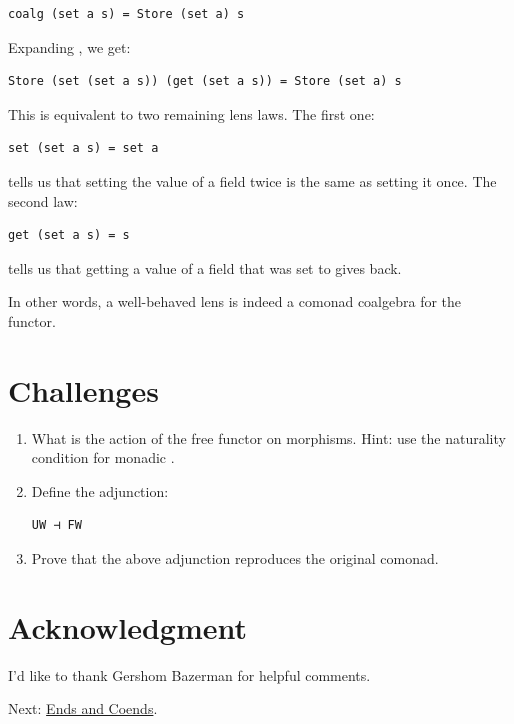 \begin{verbatim}
coalg (set a s) = Store (set a) s
\end{verbatim}

Expanding , we get:

\begin{verbatim}
Store (set (set a s)) (get (set a s)) = Store (set a) s
\end{verbatim}

This is equivalent to two remaining lens laws. The first one:

\begin{verbatim}
set (set a s) = set a
\end{verbatim}

tells us that setting the value of a field twice is the same as setting
it once. The second law:

\begin{verbatim}
get (set a s) = s
\end{verbatim}

tells us that getting a value of a field that was set to 
gives  back.

In other words, a well-behaved lens is indeed a comonad coalgebra for
the  functor.

\section{Challenges}\label{challenges}

\begin{enumerate}
\item
  What is the action of the free functor
   on morphisms. Hint: use the
  naturality condition for monadic .
\item
  Define the adjunction:

\begin{verbatim}
UW ⊣ FW
\end{verbatim}
\item
  Prove that the above adjunction reproduces the original comonad.
\end{enumerate}

\section{Acknowledgment}\label{acknowledgment}

I'd like to thank Gershom Bazerman for helpful comments.

Next:
\href{https://bartoszmilewski.com/2017/03/29/ends-and-coends/}{Ends and
Coends}.
